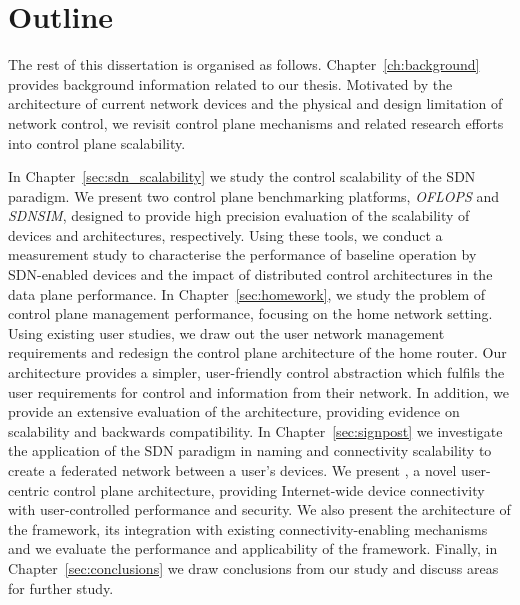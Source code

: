 \section{Outline} \label{sec:intro:outline}

The rest of this dissertation is organised as follows.
Chapter~\ref{ch:background} provides background information related to our
thesis. Motivated by the architecture of current network devices and the
physical and design limitation of network control, we revisit control plane
mechanisms and related research efforts into control plane scalability.  

In Chapter~\ref{sec:sdn_scalability} we study the control scalability of the
SDN paradigm.  We present two control plane benchmarking platforms,
\textit{OFLOPS} and \textit{SDNSIM}, designed to provide high precision
evaluation of the scalability of \of{} devices and architectures, respectively.
Using these tools, we conduct a measurement study to characterise the
performance of baseline \of{} operation by SDN-enabled devices and the impact
of distributed control architectures in the data plane performance.  In
Chapter~\ref{sec:homework}, we study the problem of control plane management
performance, focusing on the home network setting. Using existing user studies,
we draw out the user network management requirements and redesign the control plane
architecture of the home router. Our architecture provides a simpler,
user-friendly control abstraction which fulfils the user requirements for
control and information from their network. In addition, we provide an
extensive evaluation of the architecture, providing evidence on scalability
and backwards compatibility.  In Chapter~\ref{sec:signpost} we investigate
the application of the SDN paradigm in naming and connectivity scalability to
create a federated network between a user's devices. We present \signpost,
a novel user-centric control plane architecture, providing Internet-wide device
connectivity with user-controlled performance and security. We also present the
architecture of the framework, its integration with existing
connectivity-enabling mechanisms and we evaluate the performance and
applicability of the framework.  Finally, in Chapter~\ref{sec:conclusions} we
draw conclusions from our study and discuss areas for further study. 
